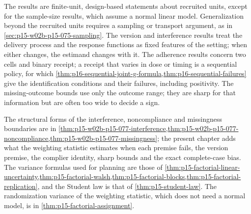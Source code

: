 The results are finite-unit, design-based statements about recruited units,
except for the sample-size results, which assume a normal linear model.
Generalization beyond the recruited units requires a sampling or transport
argument, as in \cref{sec:p15-w02b-p15-075-sampling}. The version and
interference results treat the delivery process and the response functions
as fixed features of the setting; when either changes, the estimand changes
with it. The adherence results concern two cells and binary receipt; a
receipt that varies in dose or timing is a sequential policy, for which
\cref{thm:p16-sequential-joint-g-formula,thm:p16-sequential-failures} give
the identification conditions and their failures, including positivity.
The missing-outcome bounds use only the outcome range; they are sharp for
that information but are often too wide to decide a sign.

The structural forms of the interference, noncompliance and missingness
boundaries are in
\cref{thm:p15-w02b-p15-077-interference,thm:p15-w02b-p15-077-noncompliance,thm:p15-w02b-p15-077-missingness};
the present chapter adds what the weighting statistic estimates when each
premise fails, the version premise, the complier identity, sharp bounds and
the exact complete-case bias. The variance formulas used for planning are
those of
\cref{thm:p15-factorial-linear-uncertainty,thm:p15-factorial-walsh,thm:p15-factorial-blocks,thm:p15-factorial-replication},
and the Student law is that of \cref{thm:p15-student-law}. The randomization
variance of the weighting statistic, which does not need a normal model,
is in \cref{thm:p15-factorial-assignment}.
